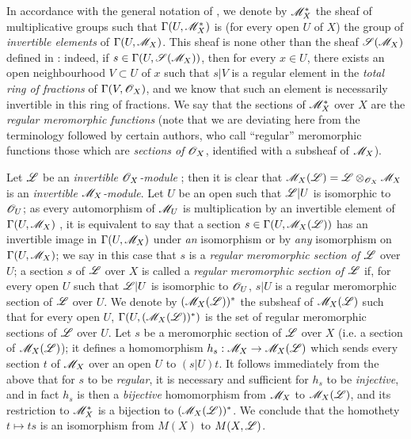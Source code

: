 \begin{env}[20.1.8]
\label{IV.20.1.8}
In accordance with the general notation of , we denote by $\mathscr{M}_X^*$ the sheaf of multiplicative groups such that $\Gamma(U,\mathscr{M}_X^*)$ is (for every open $U$ of $X$) the group of \emph{invertible elements} of $\Gamma(U,\mathscr{M}_X)$.
This sheaf is none other than the sheaf $\mathscr{S}(\mathscr{M}_X)$ defined in :
indeed, if $s\in\Gamma(U,\mathscr{S}(\mathscr{M}_X))$, then for every $x\in U$, there exists an open neighbourhood $V\subset U$ of $x$ such that $s|V$ is a regular element in the \emph{total ring of fractions} of $\Gamma(V,\mathscr{O}_X)$, and we know that such an element is necessarily invertible in this ring of fractions.
We say that the sections of $\mathscr{M}_X^*$ over $X$ are the \emph{regular meromorphic functions} (note that we are deviating here from the terminology followed by certain authors, who call ``regular'' meromorphic functions those which are \emph{sections of $\mathscr{O}_X$}, identified with a subsheaf of $\mathscr{M}_X$).

Let $\mathscr{L}$ be an \emph{invertible $\mathscr{O}_X$-module} ;
then it is clear that $\mathscr{M}_X(\mathscr{L})=\mathscr{L}\otimes_{\mathscr{O}_X}\mathscr{M}_X$
is an \emph{invertible $\mathscr{M}_X$-module}.
Let $U$ be an open such that $\mathscr{L}|U$ is isomorphic to $\mathscr{O}_U$;
as every automorphism of $\mathscr{M}_U$ is multiplication by an invertible element of $\Gamma(U,\mathscr{M}_X)$ , it is equivalent to say that a section $s\in\Gamma(U,\mathscr{M}_X(\mathscr{L}))$ has an invertible image in $\Gamma(U,\mathscr{M}_X)$ under \emph{an} isomorphism or by \emph{any} isomorphism on $\Gamma(U,\mathscr{M}_X)$;
we say in this case that $s$ is a \emph{regular meromorphic section of $\mathscr{L}$} over $U$;
a section $s$ of $\mathscr{L}$ over $X$ is called a \emph{regular meromorphic section of $\mathscr{L}$} if, for every open $U$ such that $\mathscr{L}|U$ is isomorphic to $\mathscr{O}_U$, $s|U$ is a regular meromorphic section of $\mathscr{L}$ over $U$.
We denote by $(\mathscr{M}_X(\mathscr{L}))^*$ the subsheaf of $\mathscr{M}_X(\mathscr{L})$ such that for every open $U$, $\Gamma(U,(\mathscr{M}_X(\mathscr{L}))^*)$ is the set of regular meromorphic sections of $\mathscr{L}$ over $U$.
Let $s$ be a meromorphic section of $\mathscr{L}$ over $X$ (i.e. a section of $\mathscr{M}_X(\mathscr{L})$);
it defines a homomorphism $h_s:\sh{M}_X\to\sh{M}_X(\sh{L})$ which sends every section $t$ of $\mathscr{M}_X$ over an open $U$ to $(s|U)t$.
It follows immediately from the above that for $s$ to be \emph{regular}, it is necessary and sufficient for $h_s$ to be \emph{injective}, and in fact $h_s$ is then a \emph{bijective} homomorphism from $\mathscr{M}_X$ to $\mathscr{M}_X(\mathscr{L})$, and its restriction to $\mathscr{M}_X^*$ is a bijection to $(\mathscr{M}_X(\mathscr{L}))^*$.
We conclude that the homothety $t\mapsto ts$ is an isomorphism from $M(X)$ to $M(X,\mathscr{L})$.
\end{env}

